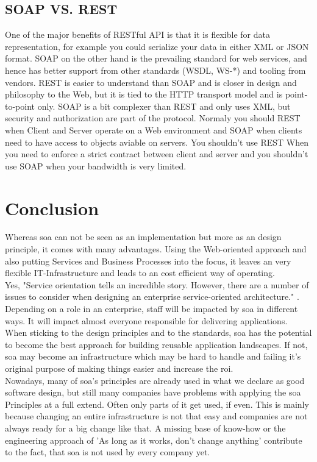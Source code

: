 \documentclass[12pt]{article}
\begin{document}
\subsection{SOAP VS. REST}
One of the major benefits of RESTful API is that it is flexible for data representation, for example you could serialize your data in either XML or JSON format. SOAP on the other hand is the prevailing standard for web services, and hence has better support from other standards (WSDL, WS-*) and tooling from vendors. REST is easier to understand than SOAP and is closer in design and philosophy to the Web, but it is tied to the HTTP transport model and is point-to-point only. SOAP is a bit complexer than REST and only uses XML, but security and authorization are part of the protocol. Normaly you should REST when Client and Server operate on a Web environment and SOAP when clients need to have access to objects aviable on servers. You shouldn't use REST When you need to enforce a strict contract between client and server and you shouldn't use SOAP when your bandwidth is very limited.

\section{Conclusion}
Whereas \gls{soa} can not be seen as an implementation but more as an design principle, it comes with many advantages. Using the Web-oriented approach and also putting Services and Business Processes into the focus, it leaves an very flexible IT-Infrastructure and leads to an cost efficient way of operating.\\
Yes, "Service orientation tells an incredible story. However, there are a number of issues to consider when designing an enterprise service-oriented architecture." \cite{pcsoa}. Depending on a role in an enterprise, staff will be impacted by \gls{soa} in different ways. It will impact almost everyone responsible for delivering applications. When sticking to the design principles and to the standards, \gls{soa} has the potential to become the best approach for building reusable application landscapes. If not, \gls{soa} may become an infrastructure which may be hard to handle and failing it's original purpose of making things easier and increase the \gls{roi}.\\
Nowadays, many of \gls{soa}'s principles are already used in what we declare as good software design, but still many companies have problems with applying the \gls{soa} Principles at a full extend. Often only parts of it get used, if even. This is mainly because changing an entire infrastructure is not that easy and companies are not always ready for a big change like that. A missing base of know-how or the engineering approach of 'As long as it works, don't change anything' contribute to the fact, that \gls{soa} is not used by every company yet.
\end{document}

